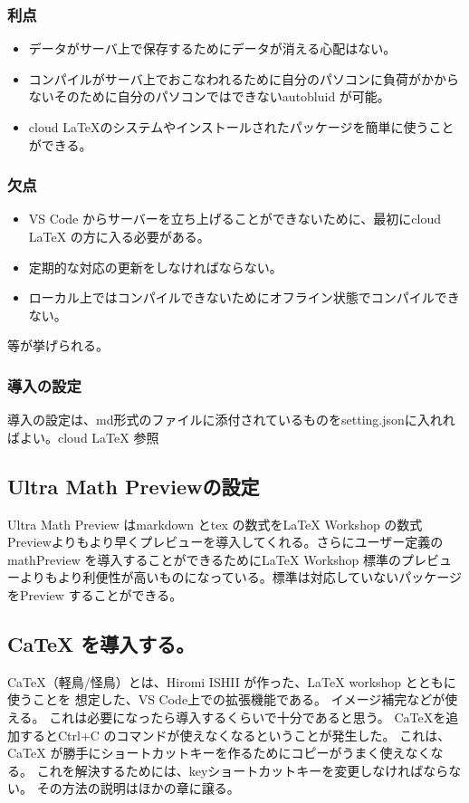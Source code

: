\documentclass{ltjsarticle}
\begin{document}
\subsubsection*{利点}
\begin{itemize}
  \item データがサーバ上で保存するためにデータが消える心配はない。
  \item コンパイルがサーバ上でおこなわれるために自分のパソコンに負荷がかからないそのために自分のパソコンではできないautobluid が可能。
  \item cloud LaTeXのシステムやインストールされたパッケージを簡単に使うことができる。
\end{itemize}
\subsubsection*{欠点}
\begin{itemize}
  \item VS Code からサーバーを立ち上げることができないために、最初にcloud LaTeX の方に入る必要がある。
  \item 定期的な対応の更新をしなければならない。
  \item ローカル上ではコンパイルできないためにオフライン状態でコンパイルできない。
\end{itemize}
等が挙げられる。
\subsubsection{導入の設定}
導入の設定は、md形式のファイルに添付されているものをsetting.jsonに入れればよい。cloud LaTeX 参照
\subsection{Ultra Math Previewの設定}
Ultra Math Preview はmarkdown とtex の数式をLaTeX Workshop の数式Previewよりもより早くプレビューを導入してくれる。さらにユーザー定義のmathPreview を導入することができるためにLaTeX Workshop 標準のプレビューよりもより利便性が高いものになっている。標準は対応していないパッケージをPreview することができる。
\subsection{CaTeX を導入する。}
CaTeX（軽鳥/怪鳥）とは、Hiromi ISHII が作った、LaTeX workshop とともに使うことを
想定した、VS Code上での拡張機能である。
イメージ補完などが使える。
これは必要になったら導入するくらいで十分であると思う。
CaTeXを追加するとCtrl+C のコマンドが使えなくなるということが発生した。
これは、CaTeX が勝手にショートカットキーを作るためにコピーがうまく使えなくなる。
これを解決するためには、keyショートカットキーを変更しなければならない。
その方法の説明はほかの章に譲る。
\end{document}
